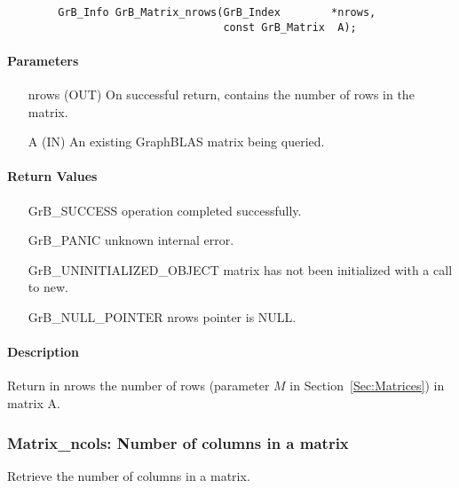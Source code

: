 \begin{verbatim}
        GrB_Info GrB_Matrix_nrows(GrB_Index        *nrows,
                                  const GrB_Matrix  A);
\end{verbatim}

\paragraph{Parameters}

\begin{itemize}[leftmargin=1.1in]
    \item[{\sf nrows}] ({\sf OUT}) On successful return, contains the number of rows in the matrix.
    \item[{\sf A}] ({\sf IN}) An existing GraphBLAS matrix being queried.
\end{itemize}


\paragraph{Return Values}

\begin{itemize}[leftmargin=2.1in]
\item[{\sf GrB\_SUCCESS}]   operation completed successfully.
\item[{\sf GrB\_PANIC}]     unknown internal error.
\item[{\sf GrB\_UNINITIALIZED\_OBJECT}]  matrix has not been initialized with a call to {\sf new}.
\item[{\sf GrB\_NULL\_POINTER}]    {\sf nrows} pointer is {\sf NULL}.
\end{itemize}

\paragraph{Description}

Return in {\sf nrows} the number of rows (parameter $M$ in Section~\ref{Sec:Matrices}) in matrix {\sf A}.

\subsubsection{{\sf Matrix\_ncols}: Number of columns in a matrix}

Retrieve the number of columns in a matrix.

\paragraph{\syntax}

